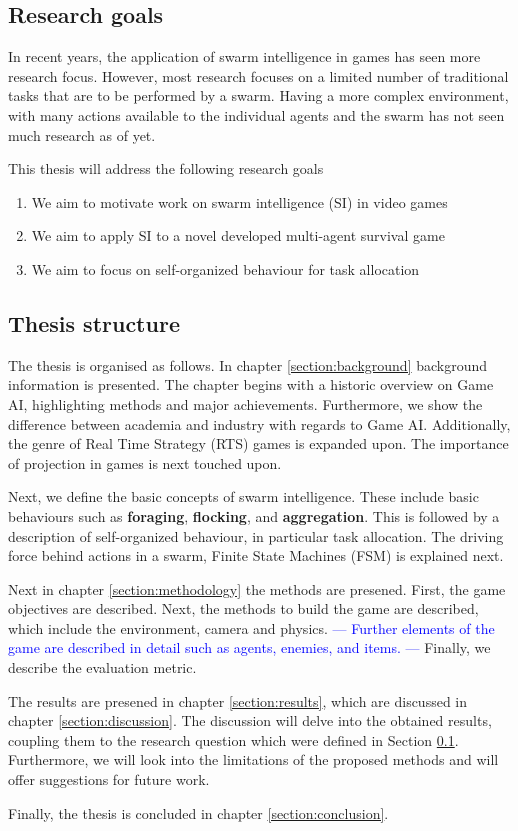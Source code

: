 \subsection{Research goals} \label{subsection:goals}
In recent years, the application of swarm intelligence in games has seen more research focus.
However, most research focuses on a limited number of traditional tasks that are to be performed by a swarm.
Having a more complex environment, 
with many actions available to the individual agents and the swarm has not seen much research as of yet.

This thesis will address the following research goals

\begin{enumerate}
    \item We aim to motivate work on swarm intelligence (SI) in video games
    \item We aim to apply SI to a novel developed multi-agent survival game
    \item We aim to focus on self-organized behaviour for task allocation
\end{enumerate}

\subsection{Thesis structure} \label{subsection:structure}

The thesis is organised as follows. 
In chapter \ref{section:background} background information is presented.
The chapter begins with a historic overview on Game AI, highlighting methods and major achievements.
Furthermore, we show the difference between academia and industry with regards to Game AI.
Additionally, the genre of Real Time Strategy (RTS) games is expanded upon.
The importance of projection in games is next touched upon.

Next, we define the basic concepts of swarm intelligence.
These include basic behaviours such as \textbf{foraging}, \textbf{flocking}, and \textbf{aggregation}.
This is followed by a description of self-organized behaviour, in particular task allocation.
The driving force behind actions in a swarm, Finite State Machines (FSM) is explained next.

Next in chapter \ref{section:methodology} the methods are presened. 
First, the game objectives are described. 
Next, the methods to build the game are described, which include the environment, camera and physics.
\textcolor{blue}{---
Further elements of the game are described in detail such as agents, enemies, and items.
---}
Finally, we describe the evaluation metric.

The results are presened in chapter \ref{section:results}, which are discussed in chapter \ref{section:discussion}.
The discussion will delve into the obtained results, coupling them to the research question which were defined in Section \ref{subsection:goals}.
Furthermore, we will look into the limitations of the proposed methods and will offer suggestions for future work.

Finally, the thesis is concluded in chapter \ref{section:conclusion}.
